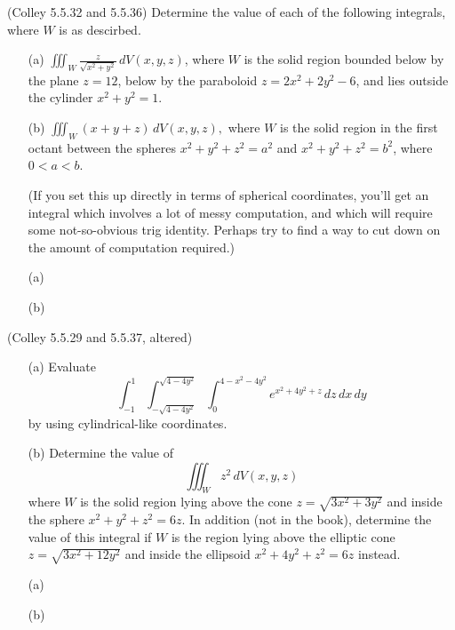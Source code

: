\documentclass[11pt,letterpaper,cm]{nupset}
\begin{document}
\begin{problem}[Exercise 1]  (Colley 5.5.32 and 5.5.36) Determine the value of each of the following integrals, where $W$ is as descirbed.
	\begin{itemize}
		\item[(a)] $\displaystyle\iiint_W \frac{z}{\sqrt{x^2+y^2}}\,dV(x,y,z)$, where $W$ is the solid region bounded below by the plane $z=12$, below by the paraboloid $z=2x^2+2y^2-6$, and lies outside the cylinder $x^2+y^2=1$.
		\item[(b)] $\displaystyle\iiint_W (x+y+z)\,dV(x,y,z),$ where $W$ is the solid region in the first octant between the spheres $x^2+y^2+z^2=a^2$ and $x^2+y^2+z^2=b^2$, where $0 < a < b$.
		\medskip
		
		(If you set this up directly in terms of spherical coordinates, you'll get an integral which involves a lot of messy computation, and which will require some not-so-obvious trig identity. Perhaps try to find a way to cut down on the amount of computation required.)
	\end{itemize}
\end{problem}
\begin{solution}
	\begin{itemize}
		\item[(a)]
		\item[(b)]
	\end{itemize}
\end{solution}
\newpage

\begin{problem}[Exercise 2] (Colley 5.5.29 and 5.5.37, altered)
	\begin{itemize}
		\item[(a)] Evaluate
		\[ \int_{-1}^1\int_{-\sqrt{4-4y^2}}^{\sqrt{4-4y^2}}\int_0^{4-x^2-4y^2} e^{x^2+4y^2+z}\,dz\,dx\,dy \]
		by using cylindrical-like coordinates.
		\item[(b)] Determine the value of
		\[ \iiint_W z^2\,dV(x,y,z) \]
		where $W$ is the solid region lying above the cone $z=\sqrt{3x^2+3y^2}$ and inside the sphere $x^2+y^2+z^2=6z$. In addition (not in the book), determine the value of this integral if $W$ is the region lying above the elliptic cone $z = \sqrt{3x^2+12y^2}$ and inside the ellipsoid $x^2+4y^2+z^2 = 6z$ instead.
	\end{itemize}
\end{problem}
\begin{solution}
\begin{itemize}
	\item[(a)]
	\item[(b)]
\end{itemize}
\end{solution}
\newpage
\end{document}
